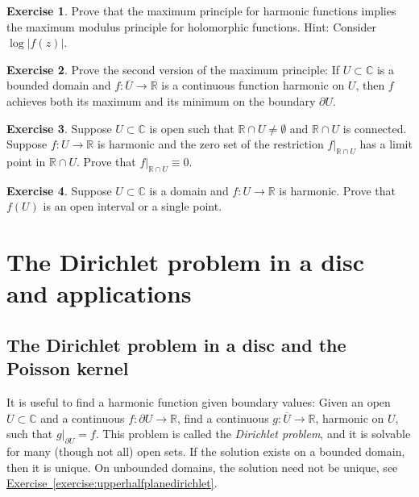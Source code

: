 \documentclass[12pt,openany]{book}
\newcommand{\widebar}[1]{\overline{#1}}
\newcommand{\sabs}[1]{\lvert {#1} \rvert}
\newcommand{\C}{{\mathbb{C}}}
\newcommand{\R}{{\mathbb{R}}}
\newcommand{\myindex}[1]{#1\index{#1}}
\theoremstyle{plain}
\theoremstyle{remark}
\theoremstyle{definition}
\newenvironment{exbox}{%
    \def\FrameCommand{\vrule width 1pt \relax\hspace{10pt}}%
    \MakeFramed{\advance\hsize-\width\FrameRestore}%
}{%
    \endMakeFramed
}
\theoremstyle{exercise}
\newtheorem{exercise}{Exercise}[section]
\theoremstyle{example}
\newcommand{\exerciseref}[1]{\hyperref[#1]{Exercise~\ref*{#1}}}
\begin{document}
\begin{exbox}
\begin{exercise}
Prove that
the maximum principle for harmonic functions implies the maximum
modulus principle for holomorphic functions.
Hint: Consider $\log \sabs{f(z)}$.
\end{exercise}

\begin{exercise}%
\label{exercise:maxprincsecondharmonic}
Prove the second version of the maximum principle: If $U \subset \C$
is a bounded domain and
$f \colon \widebar{U} \to \R$ is a continuous function
harmonic on $U$,
then $f$ achieves both its maximum and its minimum
on the boundary $\partial U$.
\end{exercise}

\begin{exercise}
Suppose $U \subset \C$ is open such that $\R \cap U \neq \emptyset$
and $\R \cap U$ is connected.
Suppose $f \colon U \to \R$ is harmonic
and the zero set of the restriction $f|_{\R \cap U}$ has a limit point in
$\R \cap U$.  Prove that $f|_{\R \cap U} \equiv 0$.
\end{exercise}

\begin{exercise}
Suppose $U \subset \C$ is a domain and
$f \colon U \to \R$ is harmonic.
Prove that $f(U)$ is an open interval or a single point.
\end{exercise}
\end{exbox}


\section{The Dirichlet problem in a disc and applications}

\subsection{The Dirichlet problem in a disc and the Poisson kernel}

It is useful to find a harmonic function given boundary values:
Given an open $U \subset \C$
and a continuous $f \colon \partial U \to \R$,
find a continuous $g \colon \widebar{U} \to \R$,
harmonic on $U$, such that $g|_{\partial U} = f$.
This problem is called the \emph{\myindex{Dirichlet problem}}, and it is
solvable for many (though not all) open sets.  If the solution exists on a
bounded domain, then it is unique.  On unbounded domains, the solution need not
be unique, see \exerciseref{exercise:upperhalfplanedirichlet}.
\end{document}
